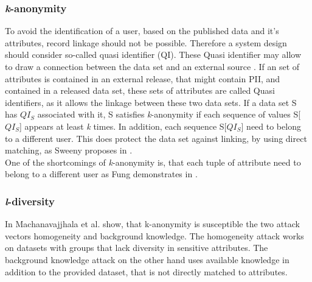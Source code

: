         \subsubsection{\textit{k}-anonymity}
            \label{subsec:related:kanon}
            To avoid the identification of a user, based on the published data and it's attributes, record linkage should not be possible. Therefore a system design should consider so-called quasi identifier (QI). These Quasi identifier may allow to draw a connection between the data set and an external source \cite{sweeney_k-anonymity_2002}.
            If an set of attributes is contained in an external release, that might contain PII, and contained in a released data set, these sets of attributes are called Quasi identifiers, as it allows the linkage between these two data sets.
            If a data set S has $QI_S$ associated with it, S satisfies \textit{k}-anonymity if each sequence of values S[$QI_S$] appears at least \textit{k} times. 
        	In addition, each sequence S[$QI_S$] need to belong to a different user.
        	This does protect the data set against linking, by using direct matching, as Sweeny proposes in  \cite{sweeney_k-anonymity_2002}.\\
            
            One of the shortcomings of \textit{k}-anonymity is, that each tuple of attribute need to belong to a different user as Fung demonstrates in  \cite{fung_introduction_2011}.

        \subsubsection{\textit{l}-diversity}
            \label{subsec:related:l-div}
            In  \cite{machanavajjhala_l-diversity_2007} Machanavajjhala et al. show, that k-anonymity is susceptible the two attack vectors homogeneity and background knowledge.
            The homogeneity attack works on datasets with groups that lack diversity in sensitive attributes. The background knowledge attack on the other hand uses available knowledge in addition to the provided dataset, that is not directly matched to attributes.\\
            

